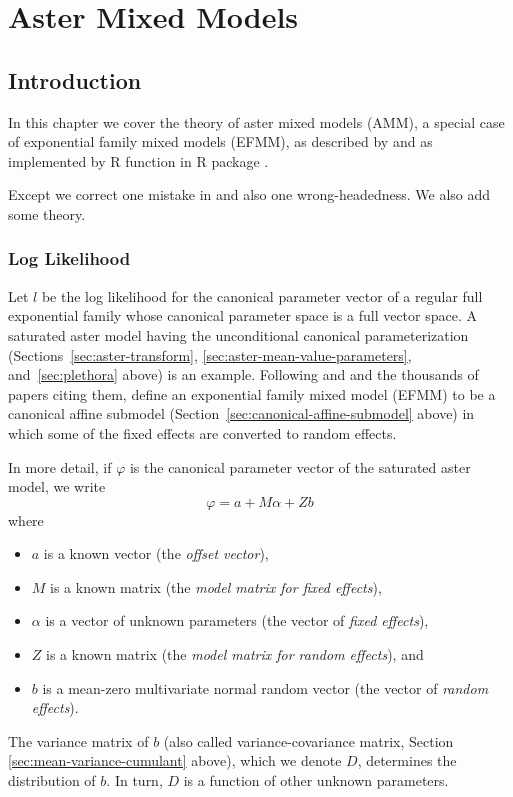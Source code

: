 
\chapter{Aster Mixed Models} \label{ch:reaster}

\section{Introduction}

In this chapter we cover the theory of aster mixed models (AMM),
a special case of exponential family mixed models (EFMM),
as described by \citet{reaster-tr,reaster} and as implemented by
R function  in R package  \citep{aster-package}.

Except we correct one mistake in \citet{reaster} and also one wrong-headedness.
We also add some theory.

\subsection{Log Likelihood}

Let $l$ be the log likelihood for the canonical parameter vector of a
regular full exponential family whose canonical parameter space is a
full vector space.  A saturated aster model having the unconditional
canonical parameterization (Sections~\ref{sec:aster-transform},
\ref{sec:aster-mean-value-parameters}, and~\ref{sec:plethora} above)
is an example.  Following \citet{breslow-clayton}
and \citet*{stiratelli-laird-ware} and the thousands of papers citing them,
\citet{reaster} define an exponential family mixed model (EFMM) to be
a canonical affine submodel (Section~\ref{sec:canonical-affine-submodel}
above) in which some of the fixed effects are converted to random effects.

In more detail, if $\varphi$ is the canonical parameter vector of the
saturated aster model, we write
\begin{equation} \label{eq:reaster-model-equation}
   \varphi = a + M \alpha + Z b
\end{equation}
where
\begin{itemize}
\item $a$ is a known vector (the \emph{offset vector}),
\item $M$ is a known matrix (the \emph{model matrix for fixed effects}),
\item $\alpha$ is a vector of unknown parameters (the vector of
    \emph{fixed effects}),
\item $Z$ is a known matrix (the \emph{model matrix for random effects}), and
\item $b$ is a mean-zero multivariate normal random vector (the vector of
    \emph{random effects}).
\end{itemize}
The variance matrix of $b$ (also called variance-covariance matrix,
Section \ref{sec:mean-variance-cumulant} above), which we denote $D$,
determines the distribution of $b$.  In turn, $D$ is a function of
other unknown parameters.

